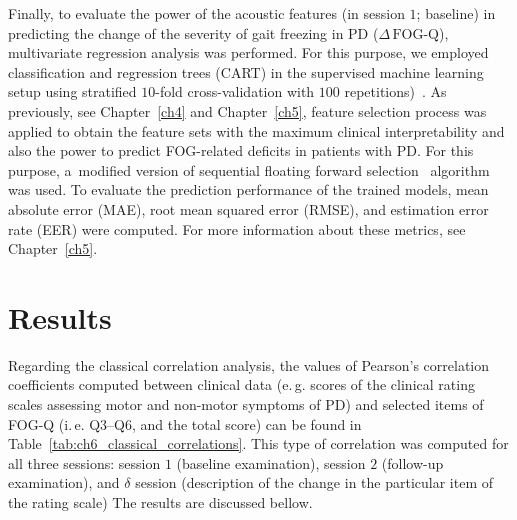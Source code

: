 Finally, to evaluate the power of the acoustic features (in session $1$; baseline) in predicting the change of the severity of gait freezing in PD ($\Delta\,\mbox{FOG-Q}$), multivariate regression analysis was performed. For this purpose, we employed classification and regression trees (CART) in the supervised machine learning setup using stratified $10$-fold cross-validation with $100$ repetitions)~\cite{Breiman1984}. As previously, see Chapter~\ref{ch4} and Chapter~\ref{ch5}, feature selection process was applied to obtain the feature sets with the maximum clinical interpretability and also the power to predict FOG-related deficits in patients with PD. For this purpose, a~modified version of sequential floating forward selection~\cite{Pohjalainen2014} algorithm was used. To evaluate the prediction performance of the trained models, mean absolute error (MAE), root mean squared error (RMSE), and estimation error rate (EER) were computed. For more information about these metrics, see Chapter~\ref{ch5}.

\section{Results}
\label{ch6_4}

Regarding the classical correlation analysis, the values of Pearson's correlation coefficients computed between clinical data (e.\,g. scores of the clinical rating scales assessing motor and non-motor symptoms of PD) and selected items of FOG-Q (i.\,e. Q3--Q6, and the total score) can be found in Table~\ref{tab:ch6_classical_correlations}. This type of correlation was computed for all three sessions: session $1$ (baseline examination), session $2$ (follow-up examination), and $\delta$ session (description of the change in the particular item of the rating scale) The results are discussed bellow.

